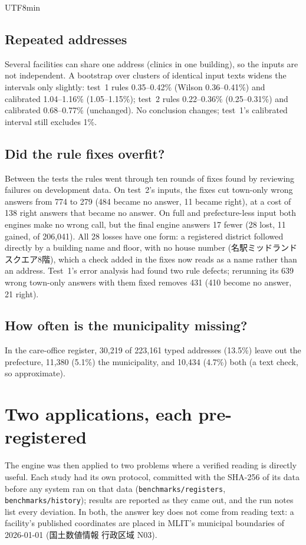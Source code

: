 \documentclass[10pt]{article}
\begin{document}
\begin{CJK}{UTF8}{min}
\subsection{Repeated addresses}
Several facilities can share one address (clinics in one building), so the inputs are not independent.
A bootstrap over clusters of identical input texts widens the intervals only slightly: test~1 rules 0.35--0.42\% (Wilson 0.36--0.41\%) and
calibrated 1.04--1.16\% (1.05--1.15\%); test~2 rules 0.22--0.36\% (0.25--0.31\%) and calibrated
0.68--0.77\% (unchanged). No conclusion changes; test~1's calibrated interval still excludes 1\%.

\subsection{Did the rule fixes overfit?}
Between the tests the rules went through ten rounds of fixes found by reviewing failures on development
data. On test~2's inputs, the fixes cut town-only wrong answers from 774 to 279 (484 became no answer, 11
became right), at a cost of 138 right answers that became no answer. On full and prefecture-less input
both engines make no wrong call, but the final engine answers 17 fewer (28 lost, 11 gained, of 206,041).
All 28 losses have one form: a registered district followed directly by a building name and floor, with no
house number (名駅ミッドランドスクエア8階), which a check added in the fixes now reads as a name rather
than an address. Test~1's error analysis had found two rule defects; rerunning its 639 wrong town-only
answers with them fixed removes 431 (410 become no answer, 21 right).

\subsection{How often is the municipality missing?}\label{sec:prevalence}
In the care-office register, 30,219 of 223,161 typed addresses (13.5\%) leave out the prefecture, 11,380
(5.1\%) the municipality, and 10,434 (4.7\%) both (a text check, so approximate).

\section{Two applications, each pre-registered}\label{sec:studies}

The engine was then applied to two problems where a verified reading is directly useful. Each study had
its own protocol, committed with the SHA-256 of its data before any system ran on that data
(\texttt{benchmarks/registers}, \texttt{benchmarks/history}); results are reported as they came out, and
the run notes list every deviation. In both, the answer key does not come from reading text: a facility's
published coordinates are placed in MLIT's municipal boundaries of 2026-01-01 (国土数値情報 行政区域 N03).


\end{CJK}
\end{document}
